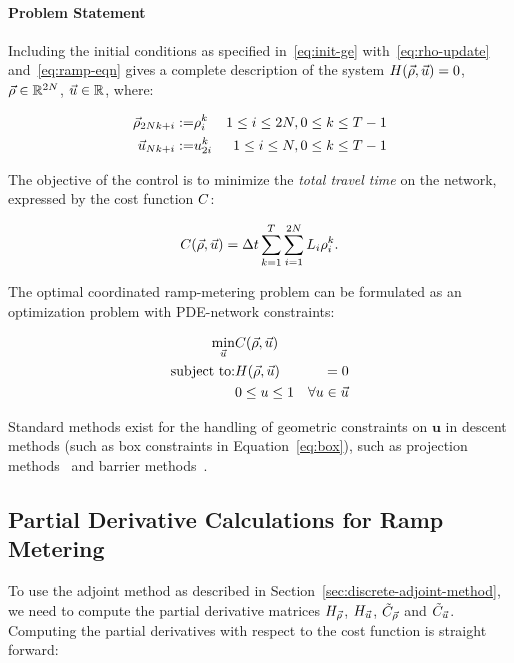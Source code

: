 \paragraph{Problem Statement}

Including the initial conditions as specified in~\eqref{eq:init-ge}
with~\eqref{eq:rho-update} and~\eqref{eq:ramp-eqn} gives
a complete description of the system $\sys\left(\state,\control\right)=0$,
$\vec{\rho}\in\mathbb{R}^{2N}$, $\vec{u}\in\mathbb{R}$, where:

\begin{eqnarray*}
\vec{\rho}_{2Nk+i}:= & \rho_{i}^{k} & 1\le i\le2N,0\le k\le T-1\\
\vec{u}_{Nk+i}:= & u_{2i}^{k} & 1\le i\le N,0\le k\le T-1
\end{eqnarray*}


The objective of the control is to minimize the \emph{total travel
time }on the network, expressed by the cost function $C$:

\[
\cost\left(\state,\control\right)=\Delta t\sum_{k=1}^{T}\sum_{i=1}^{2\nlinks}L_{i}\densitydiscrete{\link}{\tind}.
\]


The optimal coordinated ramp-metering problem can be formulated as
an optimization problem with PDE-network constraints:

\begin{eqnarray}
\min_{\control} & \cost\left(\state,\control\right)\label{eq:full}\\
\text{subject to:} & \sys\left(\state,\control\right) & =0\nonumber \\
& 0\le\convar\le1 & \forall\convar\in\control  \label{eq:box}
\end{eqnarray}

Standard methods exist for the handling of geometric constraints on $\mathbf{u}$ in descent methods (such as box constraints in Equation~\eqref{eq:box}), such as projection methods~\cite{Apice2010Modeling} and barrier methods~\cite{Fiacco1990Nonlinear,Boyd2010b}.

\subsection{Partial Derivative Calculations for Ramp Metering}
\label{sec:Applications-to-Optimal}

To use the adjoint method as described in Section~\ref{sec:discrete-adjoint-method},
we need to compute the partial derivative matrices $H_{\vec{\rho}}$, $H_{\vec{u}}$,
$\tilde{C}_{\vec{\rho}}$ and $\tilde{C}_{\vec{u}}$. Computing the partial
derivatives with respect to the cost function is straight forward:

